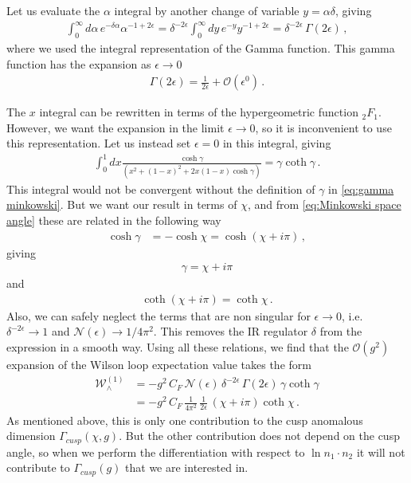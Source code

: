 Let us evaluate the $\alpha$ integral by another change of variable $y=\alpha\delta$, giving
\begin{align}
    \int_{0}^{\infty}d\alpha\,e^{-\delta\alpha}\alpha^{-1+2\epsilon}=\delta^{-2\epsilon}\int_{0}^{\infty}dy\,e^{-y}y^{-1+2\epsilon}=\delta^{-2\epsilon}\,\Gamma(2\epsilon)\,,
\end{align}
where we used the integral representation of the Gamma function. This gamma function has the expansion as $\epsilon\rightarrow 0$
\begin{align}
    \Gamma(2\epsilon)=\frac{1}{2\epsilon}+\mathcal{O}(\epsilon^{0})\,.
\end{align}

The $x$ integral can be rewritten in terms of the hypergeometric function $_{2}F_{1}$. However, we want the expansion in the limit $\epsilon\rightarrow 0$, so it is inconvenient to use this representation. Let us instead set $\epsilon=0$ in this integral, giving
\begin{align}
    \int_{0}^{1}dx\frac{\cosh\gamma}{(x^{2}+(1-x)^{2}+2x(1-x)\cosh\gamma)}=\gamma\coth\gamma\,.
\end{align}
This integral would not be convergent without the definition of $\gamma$ in \cref{eq:gamma minkowski}. But we want our result in terms of $\chi$, and from \cref{eq:Minkowski space angle} these are related in the following way
\begin{align}
    \cosh\gamma&=-\cosh\chi=\cosh(\chi+i\pi)\,,
\end{align}
giving
\begin{align}
    \gamma=\chi+i\pi
\end{align}
and
\begin{align}
    \coth(\chi+i\pi)=\coth\chi\,.
\end{align}
Also, we can safely neglect the terms that are non singular for $\epsilon\rightarrow 0$, i.e. $\delta^{-2\epsilon}\rightarrow 1$ and $\mathcal{N}(\epsilon)\rightarrow 1/4\pi^{2}$. This removes the IR regulator $\delta$ from the expression in a smooth way. Using all these relations, we find that the $\mathcal{O}(g^{2})$ expansion of the Wilson loop expectation value takes the form
\begin{align}\label{eq:one loop wedge wilson loop}
    \mathcal{W}_{\wedge}^{(1)}&=-g^{2}\,C_{F}\,\mathcal{N}(\epsilon)\,\delta^{-2\epsilon}\,\Gamma(2\epsilon)\,\gamma\coth\gamma\nonumber
    \\
    &=-g^{2}\,C_{F}\,\frac{1}{4\pi^{2}}\,\frac{1}{2\epsilon}\,(\chi+i\pi)\coth\chi\,.
\end{align}
As mentioned above, this is only one contribution to the cusp anomalous dimension $\Gamma_{cusp}(\chi,g)$. But the other contribution does not depend on the cusp angle, so when we perform the differentiation with respect to $\ln n_1\cdot n_2$ it will not contribute to $\Gamma_{cusp}(g)$ that we are interested in.

